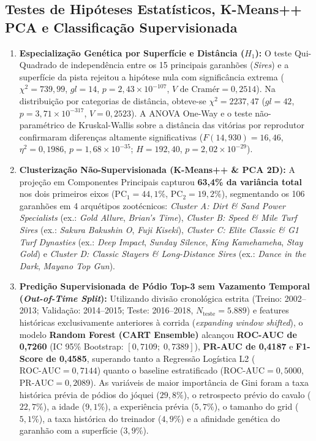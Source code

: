 \documentclass[12pt,a4paper]{article}
\begin{document}
\subsection{Testes de Hipóteses Estatísticos, K-Means++ PCA e Classificação Supervisionada}
\begin{enumerate}
    \item \textbf{Especialização Genética por Superfície e Distância ($H_1$):} O teste Qui-Quadrado de independência entre os 15 principais garanhões (\textit{Sires}) e a superfície da pista rejeitou a hipótese nula com significância extrema ($\chi^2 = 739,99$, $gl = 14$, $p = 2,43 \times 10^{-107}$, $V \text{ de Cramér} = 0,2514$). Na distribuição por categorias de distância, obteve-se $\chi^2 = 2237,47$ ($gl = 42$, $p = 3,71 \times 10^{-317}$, $V = 0,2523$). A ANOVA One-Way e o teste não-paramétrico de Kruskal-Wallis sobre a distância das vitórias por reprodutor confirmaram diferenças altamente significativas ($F(14, 930) = 16,46$, $\eta^2 = 0,1986$, $p = 1,68 \times 10^{-35}$; $H = 192,40$, $p = 2,02 \times 10^{-29}$).
    \item \textbf{Clusterização Não-Supervisionada (K-Means++ \& PCA 2D):} A projeção em Componentes Principais capturou \textbf{63,4\% da variância total} nos dois primeiros eixos ($\text{PC}_1 = 44,1\%$, $\text{PC}_2 = 19,2\%$), segmentando os 106 garanhões em 4 arquétipos zootécnicos: \textit{Cluster A: Dirt \& Sand Power Specialists} (ex.: \textit{Gold Allure}, \textit{Brian's Time}), \textit{Cluster B: Speed \& Mile Turf Sires} (ex.: \textit{Sakura Bakushin O}, \textit{Fuji Kiseki}), \textit{Cluster C: Elite Classic \& G1 Turf Dynasties} (ex.: \textit{Deep Impact}, \textit{Sunday Silence}, \textit{King Kamehameha}, \textit{Stay Gold}) e \textit{Cluster D: Classic Stayers \& Long-Distance Sires} (ex.: \textit{Dance in the Dark}, \textit{Mayano Top Gun}).
    \item \textbf{Predição Supervisionada de Pódio Top-3 sem Vazamento Temporal (\textit{Out-of-Time Split}):} Utilizando divisão cronológica estrita (Treino: 2002--2013; Validação: 2014--2015; Teste: 2016--2018, $N_{\text{teste}} = 5.889$) e features históricas exclusivamente anteriores à corrida (\textit{expanding window shifted}), o modelo \textbf{Random Forest (CART Ensemble)} alcançou \textbf{ROC-AUC de 0,7260} (IC 95\% Bootstrap: $[0,7109;\; 0,7389]$), \textbf{PR-AUC de 0,4187} e \textbf{F1-Score de 0,4585}, superando tanto a Regressão Logística L2 ($\text{ROC-AUC} = 0,7144$) quanto o baseline estratificado ($\text{ROC-AUC} = 0,5000$, $\text{PR-AUC} = 0,2089$). As variáveis de maior importância de Gini foram a taxa histórica prévia de pódios do jóquei ($29,8\%$), o retrospecto prévio do cavalo ($22,7\%$), a idade ($9,1\%$), a experiência prévia ($5,7\%$), o tamanho do grid ($5,1\%$), a taxa histórica do treinador ($4,9\%$) e a afinidade genética do garanhão com a superfície ($3,9\%$).
\end{enumerate}
\end{document}
